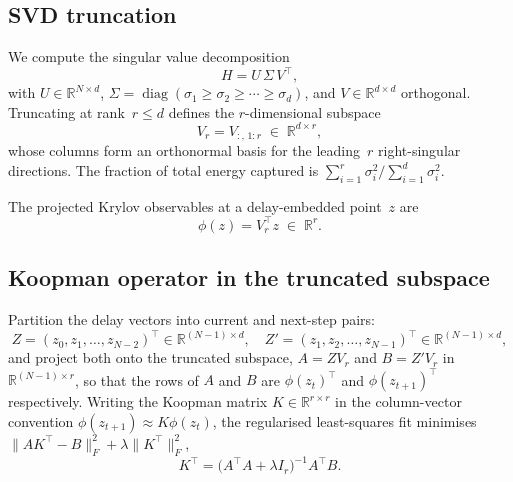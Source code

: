 \documentclass{article}
\theoremstyle{definition}
\begin{document}
\subsection{SVD truncation}

We compute the singular value decomposition
\begin{equation}\label{eq:svd}
  H = U\,\Sigma\,V^\top,
\end{equation}
with $U \in \mathbb{R}^{N \times d}$,
$\Sigma = \operatorname{diag}(\sigma_1 \geq \sigma_2 \geq \cdots \geq \sigma_d)$,
and $V \in \mathbb{R}^{d \times d}$ orthogonal.  Truncating at rank~$r \leq d$
defines the $r$-dimensional subspace
\begin{equation}\label{eq:Vr}
  V_r = V_{:,\,1{:}r} \;\in\; \mathbb{R}^{d \times r},
\end{equation}
whose columns form an orthonormal basis for the leading~$r$
right-singular directions.  The fraction of total energy captured is
$\sum_{i=1}^r \sigma_i^2 \big/ \sum_{i=1}^d \sigma_i^2$.

The projected Krylov observables at a delay-embedded point~$z$ are
\begin{equation}\label{eq:proj}
  \phi(z) = V_r^\top z \;\in\; \mathbb{R}^r.
\end{equation}

\subsection{Koopman operator in the truncated subspace}

Partition the delay vectors into current and next-step pairs:
\begin{equation}
  Z = (z_0, z_1, \dots, z_{N-2})^\top \in \mathbb{R}^{(N{-}1)\times d},
  \quad
  Z' = (z_1, z_2, \dots, z_{N-1})^\top \in \mathbb{R}^{(N{-}1)\times d},
\end{equation}
and project both onto the truncated subspace, $A=ZV_r$ and $B=Z'V_r$ in
$\mathbb{R}^{(N{-}1)\times r}$, so that the rows of $A$ and $B$ are
$\phi(z_t)^\top$ and $\phi(z_{t+1})^\top$ respectively.  Writing the
Koopman matrix $K\in\mathbb R^{r\times r}$ in the column-vector
convention $\phi(z_{t+1})\approx K\phi(z_t)$, the regularised
least-squares fit minimises $\|AK^\top-B\|_F^2+\lambda\|K^\top\|_F^2$,
\begin{equation}\label{eq:koopman_fit}
  K^\top = \bigl(A^\top A + \lambda I_r\bigr)^{-1} A^\top B.
\end{equation}
\end{document}

